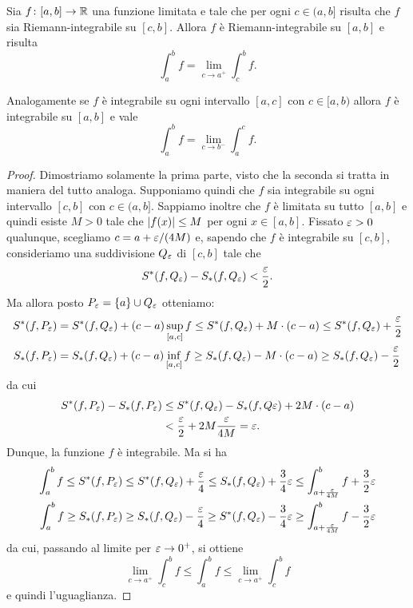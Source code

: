 \begin{theorem}
\label{th:integrale_continuo}
Sia $f\colon [a,b]\to {\mathbb R}$ una funzione limitata e tale
che per ogni $c\in (a,b]$ risulta che $f$ sia Riemann-integrabile
su $[c,b]$. Allora $f$ è Riemann-integrabile su $[a,b]$ e risulta
\[
  \int_a^b f = \lim_{c\to a^+} \int_c^b f.
\]

Analogamente se $f$ è integrabile su ogni intervallo $[a,c]$
con $c\in [a,b)$ allora $f$ è integrabile su $[a,b]$ e vale
\[
  \int_a^b f = \lim_{c\to b^-} \int_a^c f.
\]
\end{theorem}
%
\begin{proof}
Dimostriamo solamente la prima parte, visto che la seconda si tratta in
maniera del tutto analoga. Supponiamo quindi che $f$ sia integrabile su ogni
intervallo $[c,b]$ con $c\in (a,b]$. Sappiamo inoltre che $f$ è limitata su
tutto $[a,b]$ e quindi esiste $M>0$ tale che ${\left|f(x)\right|}\le M$ per ogni
$x\in [a,b]$. Fissato $\varepsilon>0$ qualunque,
scegliamo $c = a + \varepsilon/(4M)$ e, sapendo che $f$ è integrabile su $[c,b]$,
consideriamo una suddivisione $Q_\varepsilon$ di $[c,b]$ tale che
\[
  S^*(f, Q_\varepsilon) - S_*(f, Q_\varepsilon) < \frac {\varepsilon} 2.
\]
Ma allora posto $P_\varepsilon = {\left\{ a \right\}} \cup Q_\varepsilon$ otteniamo:
\begin{align*}
  S^*(f,P_\varepsilon) &= S^*(f,Q_\varepsilon) + (c-a)\sup_{[a,c]} f
    \le S^*(f,Q_\varepsilon) + M \cdot (c-a) \le S^*(f,Q_\varepsilon) + \frac {\varepsilon} 2\\
  S_*(f,P_\varepsilon) &= S_*(f,Q_\varepsilon) + (c-a)\inf_{[a,c]} f
    \ge S_*(f,Q_\varepsilon) - M \cdot (c-a) \ge S_*(f,Q_\varepsilon) - \frac {\varepsilon} 2
\end{align*}
da cui
\begin{align*}
  S^*(f,P_\varepsilon)-S_*(f,P_\varepsilon)
  &\le S^*(f,Q_\varepsilon) - S_*(f,Q\varepsilon) + 2 M \cdot (c-a)\\
  &< \frac{\varepsilon}{2} + 2 M \frac{\varepsilon}{4M}
  = \varepsilon.
\end{align*}
Dunque, la funzione $f$ è integrabile. Ma si ha
\begin{align*}
\int_a^b f \le S^*(f,P_\varepsilon) \le S^*(f,Q_\varepsilon) + \frac{\varepsilon}{4}
\le S_*(f,Q_\varepsilon) + \frac 3 4 \varepsilon
\le \int_{a+\frac {\varepsilon}{4M}}^b f + \frac {3}{2} \varepsilon \\
\int_a^b f \ge S_*(f,P_\varepsilon) \ge S_*(f,Q_\varepsilon) - \frac{\varepsilon}{4}
\ge S^*(f,Q_\varepsilon) - \frac 3 4 \varepsilon
\ge \int_{a+\frac {\varepsilon}{4M}}^b f - \frac {3}{2} \varepsilon
\end{align*}
da cui, passando al limite per $\varepsilon \to 0^+$, si ottiene
\[
  \lim_{c\to a^+} \int_c^b f \le \int_a^b f \le \lim_{c\to a^+} \int_c^b f
\]
e quindi l'uguaglianza.
\end{proof}

